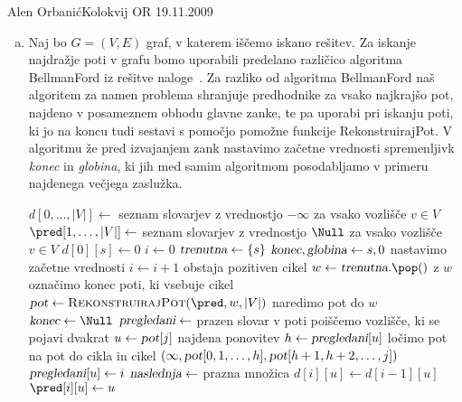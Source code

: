 \begin{naloga}{Alen Orbanić}{Kolokvij OR 19.11.2009}
\begin{odgovor}
\begin{enumerate}[(a)]
\item Naj bo $G=(V,E)$ graf, v katerem iščemo iskano rešitev.
Za iskanje najdražje poti v grafu
bomo uporabili predelano različico algoritma {\sc BellmanFord}
iz rešitve naloge~\res[bf].
Za razliko od algoritma {\sc BellmanFord}
naš algoritem za namen problema shranjuje predhodnike za vsako najkrajšo pot,
najdeno v posameznem obhodu glavne zanke,
te pa uporabi pri iskanju poti,
ki jo na koncu tudi sestavi s pomočjo pomožne funkcije {\sc RekonstruirajPot}.
V algoritmu že pred izvajanjem zank
nastavimo začetne vrednosti spremenljivk {\sl konec} in {\sl globina},
ki jih med samim algoritmom posodabljamo v primeru najdenega večjega zaslužka.
\begin{small}
\begin{algorithmic}
    \State $d[0, \dots, |V|] \gets$ seznam slovarjev z vrednostjo $-\infty$ za vsako vozlišče $v \in V$
    \State $\pred[1, \dots, |V|] \gets$ seznam slovarjev z vrednostjo $\Null$
    za vsako vozlišče $v \in V$
    \State $d[0][s] \gets 0$
    \State $i \gets 0$
    \State $\text{\sl trenutna} \gets \{s\}$
    \State $\text{\sl konec}, \text{\sl globina} \gets s, 0$  \hfill nastavimo začetne vrednosti
        \State $i \gets i+1$
         \hfill obstaja pozitiven cikel
            \State $w \gets \text{\sl trenutna}.\pop()$ \hfill z $w$ označimo konec poti, ki vsebuje cikel
            \State $\text{\sl pot} \gets \text{\sc RekonstruirajPot}(\pred, w, |V|)$ \hfill naredimo pot do $w$
            \State $\text{\sl konec} \gets \Null$
            \State $\text{\sl pregledani} \gets$ prazen slovar
             \hfill v poti poiščemo vozlišče, ki se pojavi dvakrat
                \State $u \gets \text{\sl pot}[j]$
                 \hfill najdena ponovitev
                    \State $h \gets \text{\sl pregledani}[u]$ \hfill ločimo pot na pot do cikla in cikel
	                \State \Return $(\infty, \text{\sl pot}[0, 1, \dots, h], \text{\sl pot}[h+1, h+2, \dots, j])$
                \EndIf
                \State $\text{\sl pregledani}[u] \gets i$
            \EndFor
        \EndIf
        \State $\text{\sl{naslednja}} \gets$ prazna množica
            \State $d[i][u] \gets d[i-1][u]$
            \State $\pred[i][u] \gets u$
        \EndFor

\end{algorithmic}
\end{small}
\end{enumerate}
\end{odgovor}
\end{naloga}
